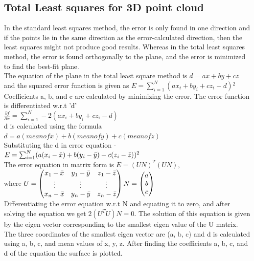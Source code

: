 \subsection{Total Least squares for 3D point cloud}
 In the standard least squares method, the error is only found in one direction and if the points lie in the same direction as the error-calculated direction, then the least squares might not produce good results. Whereas in the total least squares method, the error is found orthogonally to the plane, and the error is minimized to find the best-fit plane. \\
 The equation of the plane in the total least square method is $d = ax + by + cz$ and the squared error function is given as $E = \sum_{i=1}^{N} (ax{_i} + by_i + cz_i - d){^2}$ \\
 Coefficients a, b, and c are calculated by minimizing the error. The error function is differentiated w.r.t 'd' \\
 $\frac{\partial f}{\partial x} = \sum_{i=1}^{N} -2 (ax{_i} + by_i + cz_i - d) $\\
 d is calculated using the formula $d = a (mean of x) + b (mean of y) + c (mean of z)$ \\
 Substituting the d in error equation - \\
 $E = \sum_{i=1}^{N} (a(x{_i} - \Bar{x}) + b(y{_i} - \Bar{y}) + c(z{_i} - \Bar{z})){^2}$ \\
 The error equation in matrix form is $E = (UN)^T (UN)$, \vspace{3mm} \\
where $ U = 
 \begin{pmatrix}
     x{_1} - \Bar{x} & y{_1} - \Bar{y} & z{_1} - \Bar{z} \\
     \vdots & \vdots & \vdots \\
     x{_n} - \Bar{x} & y{_n} - \Bar{y} & z{_n} - \Bar{z}
 \end{pmatrix} 
 N =
 \begin{pmatrix}
    a \\
    b \\
    c
 \end{pmatrix}$ \vspace{5mm}  \\
 Differentiating the error equation w.r.t N and equating it to zero, and after solving the equation we get $2 (U^T U)N = 0$. The solution of this equation is given by the eigen vector corresponding to the smallest eigen value of the U matrix. \\
 The three coordinates of the smallest eigen vector are (a, b, c) and d is calculated using a, b, c, and mean values of x, y, z. After finding the coefficients a, b, c, and d of the equation the surface is plotted.

